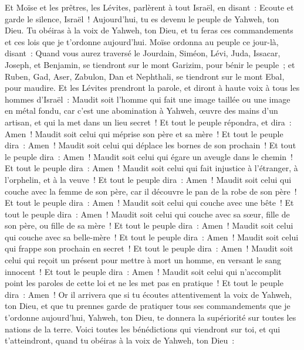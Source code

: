 \begin{multicols}{2}
Et Moïse et les prêtres, les Lévites, parlèrent à tout Israël, en disant~: Ecoute et garde le silence, Israël~! Aujourd'hui, tu es devenu le peuple de Yahweh, ton Dieu.
Tu obéiras à la voix de Yahweh, ton Dieu, et tu feras ces commandements et ces lois que je t'ordonne aujourd'hui.
Moïse ordonna au peuple ce jour-là, disant~:
Quand vous aurez traversé le Jourdain, Siméon, Lévi, Juda, Issacar, Joseph, et Benjamin, se tiendront sur le mont Garizim, pour bénir le peuple~;
et Ruben, Gad, Aser, Zabulon, Dan et Nephthali, se tiendront sur le mont Ebal, pour maudire.
Et les Lévites prendront la parole, et diront à haute voix à tous les hommes d'Israël~:
Maudit soit l'homme qui fait une image taillée ou une image en métal fondu, car c'est une abomination à Yahweh, œuvre des mains d'un artisan, et qui la met dans un lieu secret~! Et tout le peuple répondra, et dira~: Amen~!
Maudit soit celui qui méprise son père et sa mère~! Et tout le peuple dira~: Amen~!
Maudit soit celui qui déplace les bornes de son prochain~! Et tout le peuple dira~: Amen~!
Maudit soit celui qui égare un aveugle dans le chemin~! Et tout le peuple dira~: Amen~!
Maudit soit celui qui fait injustice à l'étranger, à l'orphelin, et à la veuve~! Et tout le peuple dira~: Amen~!
Maudit soit celui qui couche avec la femme de son père, car il découvre le pan de la robe de son père~! Et tout le peuple dira~: Amen~!
Maudit soit celui qui couche avec une bête~! Et tout le peuple dira~: Amen~!
Maudit soit celui qui couche avec sa sœur, fille de son père, ou fille de sa mère~! Et tout le peuple dira~: Amen~!
Maudit soit celui qui couche avec sa belle-mère~! Et tout le peuple dira~: Amen~!
Maudit soit celui qui frappe son prochain en secret~! Et tout le peuple dira~: Amen~!
Maudit soit celui qui reçoit un présent pour mettre à mort un homme, en versant le sang innocent~! Et tout le peuple dira~: Amen~!
Maudit soit celui qui n'accomplit point les paroles de cette loi et ne les met pas en pratique~! Et tout le peuple dira~: Amen~!
\VerseOne{}Or il arrivera que si tu écoutes attentivement la voix de Yahweh, ton Dieu, et que tu prennes garde de pratiquer tous ses commandements que je t'ordonne aujourd'hui, Yahweh, ton Dieu, te donnera la supériorité sur toutes les nations de la terre.
Voici toutes les bénédictions qui viendront sur toi, et qui t'atteindront, quand tu obéiras à la voix de Yahweh, ton Dieu~:

\end{multicols}
